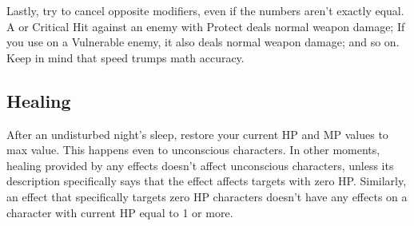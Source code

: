 \begin{multicols}{2}
\begin{boco}
Lastly, try to cancel opposite modifiers, even if the numbers aren't exactly equal. A  or Critical Hit against an enemy with Protect deals normal weapon damage; If you use  on a Vulnerable enemy, it also deals normal weapon damage; and so on. Keep in mind that speed trumps math accuracy.
\end{boco}

\subsection{Healing}\label{subsec:heal}
After an undisturbed night's sleep, restore your current HP and MP values to max value. This happens even to unconscious characters. In other moments, healing provided by any effects doesn’t affect unconscious characters, unless its description specifically says that the effect affects targets with zero HP\@. Similarly, an effect that specifically targets zero HP characters doesn’t have any effects on a character with current HP equal to 1 or more.
\end{multicols}

